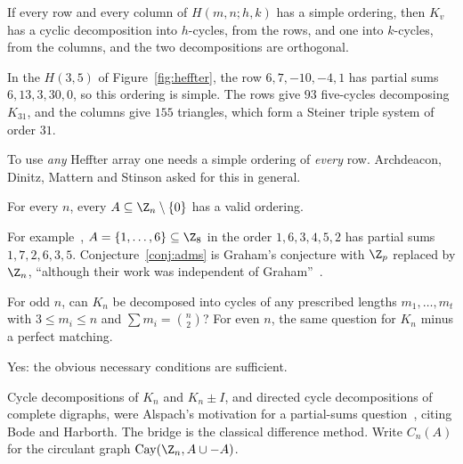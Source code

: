 \begin{fact}\label{fact:heffter}
If every row and every column of $H(m,n;h,k)$ has a simple ordering, then $K_v$ has a cyclic decomposition into $h$-cycles, from the rows, and one into $k$-cycles, from the columns, and the two decompositions are orthogonal.
\end{fact}

\begin{example}\label{ex:heffter}
In the $H(3,5)$ of Figure~\ref{fig:heffter}, the row $6,7,-10,-4,1$ has partial sums $6,13,3,30,0$, so this ordering is simple. The rows give $93$ five-cycles decomposing $K_{31}$, and the columns give $155$ triangles, which form a Steiner triple system of order $31$.
\end{example}

To use \emph{any} Heffter array one needs a simple ordering of \emph{every} row. Archdeacon, Dinitz, Mattern and Stinson asked for this in general.

\begin{conjecture}\label{conj:adms}
For every $n$, every $A\subseteq\Z_n\setminus\{0\}$ has a valid ordering.
\end{conjecture}

For example~\cite[Example~1.1]{admc16}, $A=\{1,\dots,6\}\subseteq\Z_8$ in the order $1,6,3,4,5,2$ has partial sums $1,7,2,6,3,5$. Conjecture~\ref{conj:adms} is Graham's conjecture with $\Z_p$ replaced by $\Z_n$, ``although their work was independent of Graham''~\cite[\S3.7]{oll25}.


\begin{problem}\label{prob:alspach-cycles}
For odd $n$, can $K_n$ be decomposed into cycles of any prescribed lengths $m_1,\dots,m_t$ with $3\leq m_i\leq n$ and $\sum m_i=\binom n2$? For even $n$, the same question for $K_n$ minus a perfect matching.
\end{problem}

\begin{theorem}\label{thm:bhp}
Yes: the obvious necessary conditions are sufficient.
\end{theorem}

Cycle decompositions of $K_n$ and $K_n\pm I$, and directed cycle decompositions of complete digraphs, were Alspach's motivation for a partial-sums question~\cite[\S1]{hos19}, citing Bode and Harborth. The bridge is the classical difference method. Write $C_n(A)$ for the circulant graph $\operatorname{Cay}(\Z_n,A\cup-A)$.

